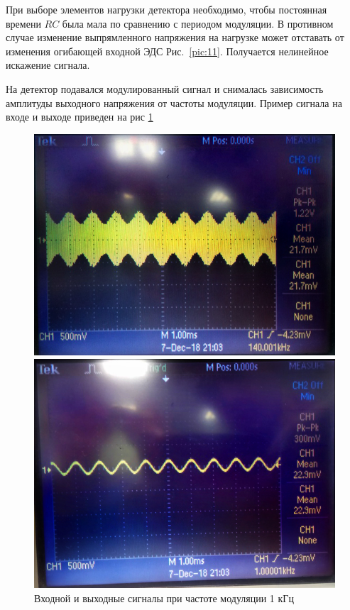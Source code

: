 При выборе элементов нагрузки детектора необходимо, чтобы постоянная времени $RC$ была мала по сравнению с периодом модуляции. В противном случае изменение выпрямленного напряжения на нагрузке может отставать от изменения огибающей входной ЭДС Рис.~\ref{pic:11}. Получается нелинейное искажение сигнала. 

На детектор подавался модулированный сигнал и снималась зависимость амплитуды выходного напряжения от частоты модуляции.
Пример сигнала на входе и выходе приведен на рис \ref{off:1}

\begin{figure}[H]
	\centering
	\begin{minipage}{0.45\linewidth}
	\includegraphics[width=0.9\linewidth]{photo/1k1.jpg}
	\end{minipage}
	\begin{minipage}{0.45\linewidth}
	\includegraphics[width=0.9\linewidth]{photo/1k2.jpg}
	\end{minipage}
	\caption{Входной и выходные сигналы при частоте модуляции 1 кГц}
	\label{off:1}
\end{figure}

